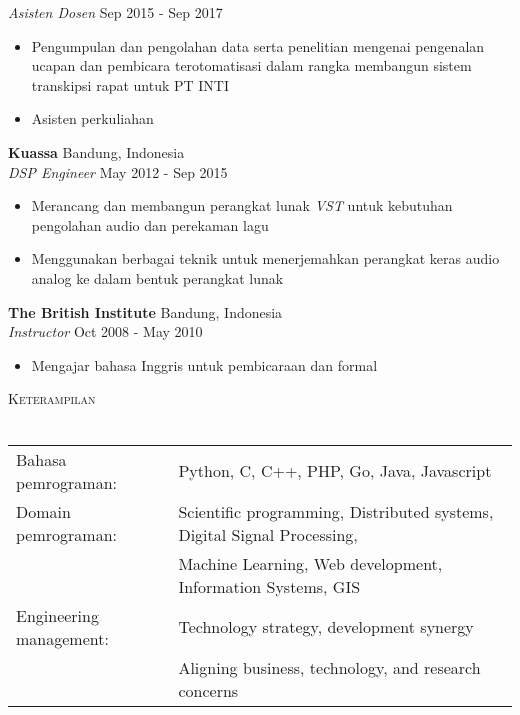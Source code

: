 \documentclass[a4paper]{article}
\newcommand{\lineunder} {
    \vspace*{-8pt} \\
    \hspace*{-18pt} \hrulefill \\
}
\newcommand{\header} [1] {
    {\hspace*{-18pt}\vspace*{6pt} \textsc{#1}}
    \vspace*{-6pt} \lineunder
}
\begin{document}
\textit{Asisten Dosen} \hfill Sep 2015 - Sep 2017\\
\vspace{-3mm}
\begin{itemize} \itemsep 1pt
  \item Pengumpulan dan pengolahan data serta penelitian mengenai pengenalan
    ucapan dan pembicara terotomatisasi dalam rangka membangun sistem transkipsi
    rapat untuk PT INTI
  \item Asisten perkuliahan
\end{itemize}
\textbf{Kuassa} \hfill Bandung, Indonesia\\
\textit{DSP Engineer} \hfill May 2012 - Sep 2015\\
\vspace{-3mm}
\begin{itemize} \itemsep 1pt
  \item Merancang dan membangun perangkat lunak \textit{VST} untuk kebutuhan pengolahan
    audio dan perekaman lagu
  \item Menggunakan berbagai teknik untuk menerjemahkan perangkat keras audio
    analog ke dalam bentuk perangkat lunak
\end{itemize}
\textbf{The British Institute} \hfill Bandung, Indonesia\\
\textit{Instructor} \hfill Oct 2008 - May 2010\\
\vspace{-3mm}
\begin{itemize} \itemsep 1pt
	\item Mengajar bahasa Inggris untuk pembicaraan dan formal
\end{itemize}
\vspace{3mm}

\header{Keterampilan}
\vspace{3mm}
\begin{tabular}{ l l }
\vspace{3mm}
	Bahasa pemrograman: & Python, C, C++, PHP, Go, Java, Javascript \\
	Domain pemrograman: & Scientific programming, Distributed systems, 
  Digital Signal Processing, \\
\vspace{3mm}
                         & Machine Learning, Web development, Information
                         Systems, GIS \\
  Engineering management: & Technology strategy, development synergy \\
\vspace{3mm}
                         & Aligning business, technology, and research
                         concerns \\
\end{tabular}
\vspace{5mm}
\end{document}
